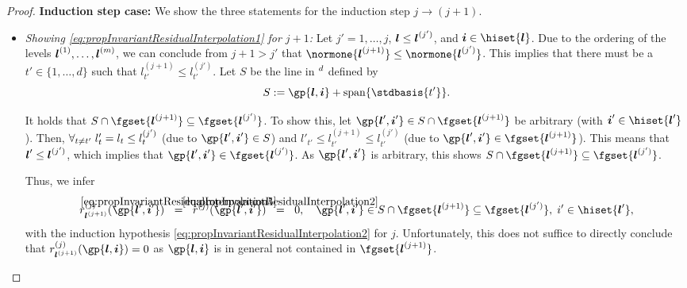 \begin{proof}
  \noindent
  \textbf{Induction step case:}
  We show the three statements for the induction step $j \to (j + 1)$.
  \begin{itemize}
    \item
    \emph{Showing \eqref{eq:propInvariantResidualInterpolation1} for $j + 1$:}
    Let $j' = 1, \dotsc, j$, ${\boldsymbol{l}} \le {\boldsymbol{l}}^{(j')}$,
    and $\*i \in \hiset{\*l}$.
    Due to the ordering of the levels ${\boldsymbol{l}}^{(1)}, \dotsc, {\boldsymbol{l}}^{(m)}$,
    we can conclude from $j + 1 > j'$ that
    $\normone{\*l^{(j+1)}} \le \normone{\*l^{(j')}}$.
    This implies that there must be a $t' \in \{1, \dotsc, d\}$
    such that $l_{t'}^{(j+1)} \le l_{t'}^{(j')}$.
    Let $S$ be the line in $\real^d$ defined by
    \begin{equation}
      S
      := \gp{\*l,\*i} + \spn\{\stdbasis{t'}\}.
    \end{equation}
    
    It holds that $S \cap \fgset{\*l^{(j+1)}} \subset \fgset{\*l^{(j')}}$.
    To show this, let $\gp{\*l',\*i'} \in S \cap \fgset{\*l^{(j+1)}}$
    be arbitrary (with $\*i' \in \hiset{\*l'}$).
    Then, $\forall_{t \not= t'}\;l'_t = l_t \le l_t^{(j')}$
    (due to $\gp{\*l',\*i'} \in S$) and
    $l'_{t'} \le l_{t'}^{(j+1)} \le l_{t'}^{(j')}$
    (due to $\gp{\*l',\*i'} \in \fgset{\*l^{(j+1)}}$).
    This means that ${\boldsymbol{l}}' \le {\boldsymbol{l}}^{(j')}$, which implies that
    $\gp{\*l',\*i'} \in \fgset{\*l^{(j')}}$.
    As $\gp{\*l',\*i'}$ is arbitrary,
    this shows $S \cap \fgset{\*l^{(j+1)}} \subset \fgset{\*l^{(j')}}$.
    
    Thus, we infer
    \begin{equation}
      \label{eq:proofPropInvariantResidualInterpolation2}
      r_{\*l^{(j+1)}}^{(j)}(\gp{\*l',\*i'})
      \eqwithref{5}
      r^{(j)}(\gp{\*l',\*i'})
      \eqwithref{2}
      0,\quad
      \gp{\*l',\*i'} \in S \cap \fgset{\*l^{(j+1)}}
      \subset \fgset{\*l^{(j')}},\;
      i' \in \hiset{\*l'},
    \end{equation}
    with the induction hypothesis
    \eqref{eq:propInvariantResidualInterpolation2} for $j$.
    Unfortunately, this does not suffice to directly conclude that
    $r_{\*l^{(j+1)}}^{(j)}(\gp{\*l,\*i}) = 0$ as
    $\gp{\*l,\*i}$ is in general not contained in $\fgset{\*l^{(j+1)}}$.
    

\end{itemize}
\end{proof}
